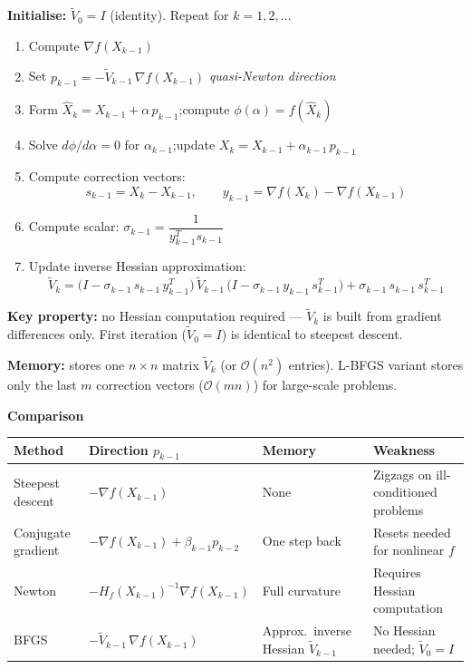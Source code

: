 \documentclass[10pt,a4paper]{article}
\newcommand{\sectionbox}[1]{%
  \begin{mdframed}[backgroundcolor=headbg, linewidth=0pt,
    innertopmargin=4pt, innerbottommargin=4pt,
    innerleftmargin=6pt, innerrightmargin=6pt]
    \large\bfseries\color{white}#1
  \end{mdframed}\vspace{2pt}
}
\newenvironment{algbox}{%
  \begin{mdframed}[backgroundcolor=boxbg, linewidth=0.6pt,
    innertopmargin=6pt, innerbottommargin=6pt,
    innerleftmargin=8pt, innerrightmargin=8pt]
}{%
  \end{mdframed}
}
\newenvironment{notebox}{%
  \begin{mdframed}[backgroundcolor=notebg, linewidth=0.6pt,
    innertopmargin=4pt, innerbottommargin=4pt,
    innerleftmargin=8pt, innerrightmargin=8pt]
}{%
  \end{mdframed}
}
\begin{document}
\begin{algbox}
\textbf{Initialise:} $\tilde{V}_0 = I$ (identity). Repeat for $k = 1, 2, \ldots$

\begin{enumerate}
  \item Compute $\nabla f(X_{k-1})$
  \item Set $p_{k-1} = -\tilde{V}_{k-1}\,\nabla f(X_{k-1})$ \hfill\textit{quasi-Newton direction}
  \item Form $\hat{X}_k = X_{k-1} + \alpha\, p_{k-1}$;\quad compute $\phi(\alpha) = f(\hat{X}_k)$
  \item Solve $d\phi/d\alpha = 0$ for $\alpha_{k-1}$;\quad update $X_k = X_{k-1} + \alpha_{k-1}\, p_{k-1}$
  \item Compute correction vectors:
    \[s_{k-1} = X_k - X_{k-1}, \qquad y_{k-1} = \nabla f(X_k) - \nabla f(X_{k-1})\]
  \item Compute scalar: $\sigma_{k-1} = \dfrac{1}{y_{k-1}^T s_{k-1}}$
  \item Update inverse Hessian approximation:
    \[\tilde{V}_k = \bigl(I - \sigma_{k-1}\,s_{k-1}\,y_{k-1}^T\bigr)\,\tilde{V}_{k-1}\,\bigl(I - \sigma_{k-1}\,y_{k-1}\,s_{k-1}^T\bigr) + \sigma_{k-1}\,s_{k-1}\,s_{k-1}^T\]
\end{enumerate}
\end{algbox}

\begin{notebox}
\textbf{Key property:} no Hessian computation required --- $\tilde{V}_k$ is built from gradient differences only.
First iteration ($\tilde{V}_0 = I$) is identical to steepest descent.

\smallskip
\textbf{Memory:} stores one $n\times n$ matrix $\tilde{V}_k$ (or $\mathcal{O}(n^2)$ entries).
L-BFGS variant stores only the last $m$ correction vectors ($\mathcal{O}(mn)$) for large-scale problems.
\end{notebox}

\vspace{4pt}
\sectionbox{Comparison}

\begin{tabular}{@{}llll@{}}
\toprule
Method & Direction $p_{k-1}$ & Memory & Weakness \\
\midrule
Steepest descent & $-\nabla f(X_{k-1})$ & None & Zigzags on ill-conditioned problems \\
Conjugate gradient & $-\nabla f(X_{k-1}) + \beta_{k-1} p_{k-2}$ & One step back & Resets needed for nonlinear $f$ \\
Newton & $-H_f(X_{k-1})^{-1}\nabla f(X_{k-1})$ & Full curvature & Requires Hessian computation \\
BFGS & $-\tilde{V}_{k-1}\,\nabla f(X_{k-1})$ & Approx.\ inverse Hessian $\tilde{V}_{k-1}$ & No Hessian needed; $\tilde{V}_0=I$ \\
\bottomrule
\end{tabular}
\end{document}
